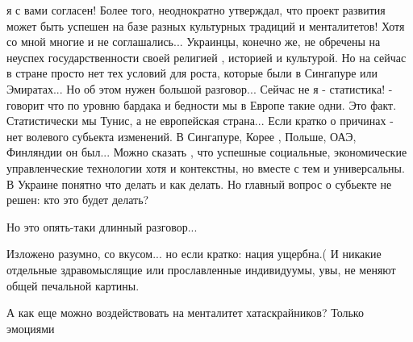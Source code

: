 \begin{itemize}
\begin{itemize}
я с вами согласен! Более того, неоднократно утверждал, что проект развития
может быть успешен на базе разных культурных традиций и менталитетов! Хотя со
мной многие и не соглашались... Украинцы, конечно же, не обречены на неуспех
государственности своей религией , историей и культурой. Но на сейчас в стране
просто нет тех условий для роста, которые были в Сингапуре или Эмиратах... Но
об этом нужен большой разговор... Сейчас не я - статистика! - говорит что по
уровню бардака и бедности мы в Европе такие одни. Это факт. Статистически мы
Тунис, а не европейская страна... Если кратко о причинах - нет волевого
субьекта изменений. В Сингапуре, Корее , Польше, ОАЭ, Финляндии он был... Можно
сказать , что успешные социальные, экономические управленческие технологии хотя
и контекстны, но вместе с тем и универсальны. В Украине понятно что делать и
как делать. Но главный вопрос о субьекте не решен: кто это будет делать?

Но это опять-таки длинный разговор...

\end{itemize} %


Изложено разумно, со вкусом... но если кратко: нация ущербна.( И никакие
отдельные здравомыслящие или прославленные индивидуумы, увы, не меняют общей
печальной картины.


А как еще можно воздействовать на менталитет хатаскрайников? Только эмоциями

\end{itemize} %
